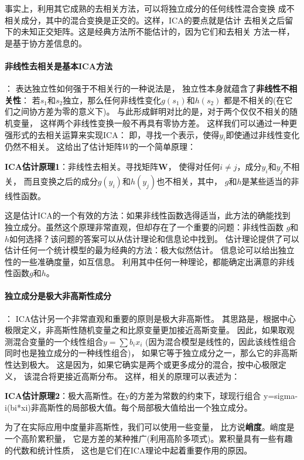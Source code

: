事实上，利用其它成熟的去相关方法，可以将独立成分的任何线性混合变换
成不相关成分，其中的混合变换是正交的。这样，ICA的要点就是估计
去相关之后留下的未知正交矩阵。这是经典方法所不能估计的，因为它们和去相关
方法一样，是基于协方差信息的。
    
\paragraph*{非线性去相关是基本ICA方法}：
表达独立性如何强于不相关行的一种说法是，
独立性本身就蕴含了\textbf{非线性不相关性}：
若$s_1$和$s_2$独立，那么任何非线性变化$g(s_1)$和$h(s_2)$
都是不相关的(在它们之间协方差为零的意义下)。
与此形成鲜明对比的是，对于两个仅仅不相关的随机变量，
这样两个非线性变换一般不再具有零协方差。
这样我们可以通过一种更强形式的去相关运算来实现ICA：
即，寻找一个表示，使得$y_i$即使通过非线性变化仍然不相关。
这给出了估计矩阵$W$的一个简单原理：

\textbf{ICA估计原理1}：非线性去相关。寻找矩阵$\bm{W}$，
使得对任何$i \ne j$，成分$y_i$和$y_j$不相关，
而且变换之后的成分$g(y_i)$和$h(y_j)$也不相关，其中，
$g$和$h$是某些适当的非线性函数。

这是估计ICA的一个有效的方法：如果非线性函数选得适当，此方法的确能找到
独立成分。虽然这个原理非常直观，但却存在了一个重要的问题：非线性函数
$g$和$h$如何选择？该问题的答案可以从估计理论和信息论中找到。
估计理论提供了可以估计任何一个统计模型的最为经典的方法：极大似然估计。
信息论可以给出独立性的一些准确度量，如互信息。
利用其中任何一种理论，都能确定出满意的非线性函数$g$和$h$。
    
\paragraph*{独立成分是极大非高斯性成分}：
ICA估计另一个非常直观和重要的原则是极大非高斯性。
其思路是，根据中心极限定义，非高斯性随机变量之和比原变量更加接近高斯变量。
因此，如果取观测混合变量的一个线性组合$y=\sum b_i x_i$
(因为混合模型是线性的，因此该线性组合同时也是独立成分的一种线性组合)，
如果它等于独立成分之一，那么它的非高斯性达到极大。
这是因为，如果它确实是两个或更多成分的混合，按中心极限定义，
该混合将更接近高斯分布。
    这样，相关的原理可以表述为：

	\textbf{ICA估计原理2}：极大高斯性。在y的方差为常数的约束下，球现行组合
	y=sigma-i(bi*xi)非高斯性的局部极大值。每个局部极大值给出一个独立成分。
    
	为了在实际应用中度量非高斯性，我们可以使用一些变量，
比方说\textbf{峭度}。峭度是一个高阶累积量，
它是方差的某种推广(利用高阶多项式)。累积量具有一些有趣的代数和统计性质，
这也是它们在ICA理论中起着重要作用的原因。
    
